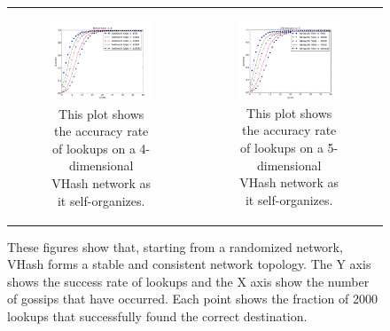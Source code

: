 \documentclass[11pt, conference, letterpaper]{IEEEtran}
\begin{document}
\begin{figure}
\begin{tabular}{cc}
		\begin{subfigure}{\columnwidth}
			\includegraphics[width=\linewidth]{conv_d4}
			\caption{This plot shows the accuracy rate of lookups on a 4-dimensional VHash network as it self-organizes.}
			\label{conv4}
		\end{subfigure} &
		
		
		\begin{subfigure}{\columnwidth}
			\includegraphics[width=\linewidth]{conv_d5}
			\caption{This plot shows the accuracy rate of lookups on a 5-dimensional VHash network as it self-organizes.}
			\label{conv5}
		\end{subfigure}
		
	\end{tabular}
	
	\caption{These figures show that, starting from a randomized network, VHash forms a stable and consistent network topology.
		The Y axis shows the success rate of lookups and the X axis show the number of gossips that have occurred.
		Each point shows the fraction of 2000 lookups that successfully found the correct destination.}
	
\end{figure}
\end{document}
